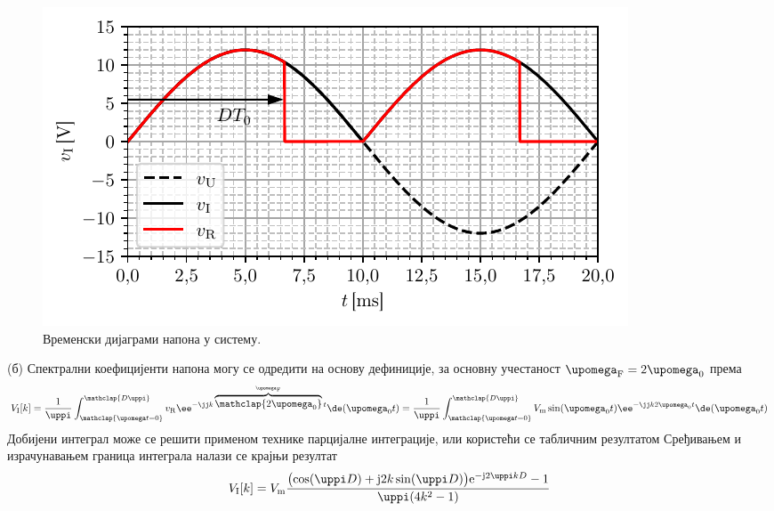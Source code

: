 \begin{figure}[ht!]
    \centering
    \includegraphics{fig/THD_vi_vr.pdf}
    \caption{Временски дијаграми напона у систему.}
    \label{fig:\ID.vivr}
\end{figure}

(б) Спектрални коефицијенти напона могу се одредити на основу дефиниције, за основну учестаност 
$\upomega_{\rm F} = 2\upomega_0$ према 
\begin{equation}
    V_{\rm I}[k] = \dfrac{1}{\uppi} \int_{\mathclap{\upomega t = 0}}^{\mathclap{D\uppi}} v_{\rm R} \ee^{-\jj k \overbrace{\mathclap{2\upomega_{\rm 0}}}^{\upomega_{\rm F}} t} \de(\upomega_0 t) 
    = \dfrac{1}{\uppi} \int_{\mathclap{\upomega t = 0}}^{\mathclap{D\uppi}} V_{\rm m} \sin(\upomega_0 t) \ee^{-\jj k {2\upomega_{\rm 0} } t} \de(\upomega_0 t) 
\end{equation}
Добијени интеграл може се решити применом технике парцијалне интеграције, или користећи се табличним резултатом 
Сређивањем и израчунавањем граница интеграла
налази се крајњи резултат
\begin{equation}
V_{\rm I}[k] = {V_{\rm m}}
\dfrac{
\bigl(
\cos(\uppi D) + 
{\rm j}2k \sin(\uppi D) 
\bigr)
{\rm e}^{-{\rm j}2\uppi kD }
-1 }{\uppi(4k^2 - 1)}
\end{equation}



